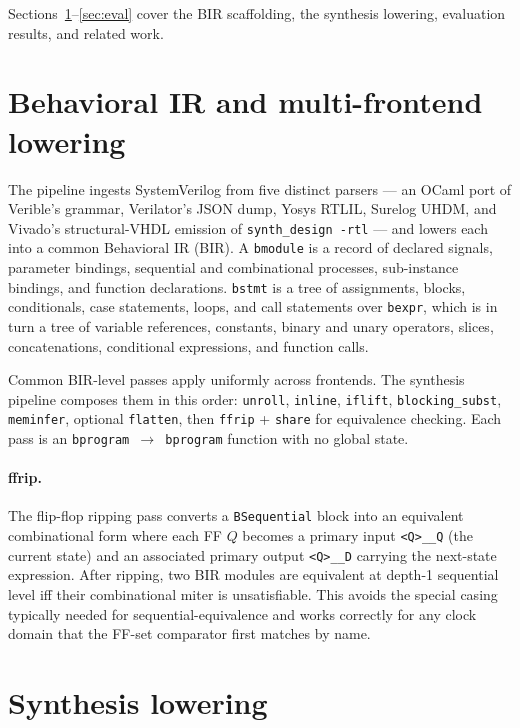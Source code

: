 \documentclass[11pt,a4paper]{article}
\begin{document}
Sections~\ref{sec:bir}--\ref{sec:eval} cover the BIR scaffolding,
the synthesis lowering, evaluation results, and related work.

\section{Behavioral IR and multi-frontend lowering}
\label{sec:bir}

The pipeline ingests SystemVerilog from five distinct parsers ---
an OCaml port of Verible's grammar, Verilator's JSON dump, Yosys
RTLIL, Surelog UHDM, and Vivado's structural-VHDL emission of
\texttt{synth\_design -rtl} --- and lowers each into a common
Behavioral IR (BIR).  A \texttt{bmodule} is a record of declared
signals, parameter bindings, sequential and combinational
processes, sub-instance bindings, and function declarations.
\texttt{bstmt} is a tree of assignments, blocks, conditionals,
case statements, loops, and call statements over \texttt{bexpr},
which is in turn a tree of variable references, constants, binary
and unary operators, slices, concatenations, conditional
expressions, and function calls.

Common BIR-level passes apply uniformly across frontends.  The
synthesis pipeline composes them in this order:
\texttt{unroll}, \texttt{inline}, \texttt{iflift},
\texttt{blocking\_subst}, \texttt{meminfer}, optional
\texttt{flatten}, then \texttt{ffrip} + \texttt{share} for
equivalence checking.  Each pass is an
\texttt{bprogram $\to$ bprogram} function with no global state.

\paragraph{ffrip.} The flip-flop ripping pass converts a
\texttt{BSequential} block into an equivalent combinational form
where each FF $Q$ becomes a primary input \texttt{<Q>\_\_Q} (the
current state) and an associated primary output \texttt{<Q>\_\_D}
carrying the next-state expression.  After ripping, two BIR
modules are equivalent at depth-1 sequential level iff their
combinational miter is unsatisfiable.  This avoids the special
casing typically needed for sequential-equivalence and works
correctly for any clock domain that the FF-set comparator first
matches by name.

\section{Synthesis lowering}
\label{sec:synth}
\end{document}
